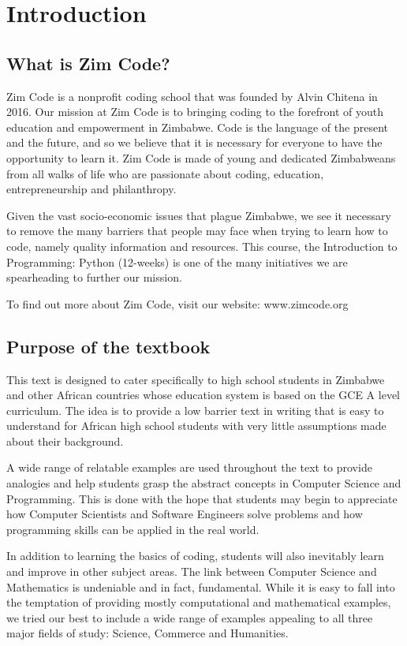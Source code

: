 
\chapter{Introduction}

\section{What is Zim Code?}

Zim Code is a nonprofit coding school that was founded by Alvin Chitena in 2016. Our mission at Zim Code is to bringing coding to the forefront of youth education and empowerment in Zimbabwe. Code is the language of the present and the future, and so we believe that it is necessary for everyone to have the opportunity to learn it. Zim Code is made of young and dedicated Zimbabweans from all walks of life who are passionate about coding, education, entrepreneurship and philanthropy. 

Given the vast socio-economic issues that plague Zimbabwe, we see it necessary to remove the many barriers that people may face when trying to learn how to code, namely quality information and resources. This course, the Introduction to Programming: Python (12-weeks) is one of the many initiatives we are spearheading to further our mission.

To find out more about Zim Code, visit our website: www.zimcode.org

\section{Purpose of the textbook}

This text is designed to cater specifically to high school students in Zimbabwe and other African
countries whose education system is based on the GCE A level curriculum. The idea is to
provide a low barrier text in writing that is easy to understand for African high school students with very little assumptions made about their background. 

A wide range of relatable examples are used throughout the text to provide analogies and help students grasp the abstract concepts in Computer Science and Programming. This is done with the hope that students may begin to appreciate how Computer Scientists and Software Engineers solve problems and how programming skills can be applied in the real world.

In addition to learning the basics of coding, students will also inevitably learn and improve in other subject areas. The link between Computer Science and Mathematics is undeniable and in fact, fundamental. While it is easy to fall into the temptation of providing mostly computational and mathematical examples, we tried our best to include a wide range of examples appealing to 
all three major fields of study: Science, Commerce and Humanities. 

